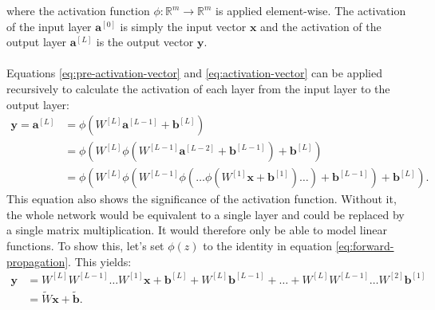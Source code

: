 where the activation function $\phi: \mathbb{R}^m \rightarrow \mathbb{R}^m$ is applied element-wise.
The activation of the input layer $\bm{a}^{[0]}$ is simply the input vector $\bm{x}$ and the activation of the output layer $\bm{a}^{[L]}$ is the output vector $\bm{y}$.
\\
\\
Equations \ref{eq:pre-activation-vector} and \ref{eq:activation-vector} can be applied recursively to calculate the activation of each layer from the input layer to the output layer:
\begin{align}
    \bm{y} = \bm{a}^{[L]} &= \phi(W^{[L]} \bm{a}^{[L-1]} + \bm{b}^{[L]}) \\
    &= \phi(W^{[L]} \phi(W^{[L-1]} \bm{a}^{[L-2]} + \bm{b}^{[L-1]}) + \bm{b}^{[L]}) \\
    &= \phi(W^{[L]} \phi(W^{[L-1]} \phi(\dots \phi(W^{[1]} \bm{x} + \bm{b}^{[1]}) \dots) + \bm{b}^{[L-1]}) + \bm{b}^{[L]}) \text{.}
    \label{eq:forward-propagation}
\end{align}
This equation also shows the significance of the activation function. 
Without it, the whole network would be equivalent to a single layer and could be replaced by a single matrix multiplication.
It would therefore only be able to model linear functions. 
To show this, let's set $\phi(z)$ to the identity in equation \ref{eq:forward-propagation}. This yields:
\begin{align}
    \bm{y} &= W^{[L]} W^{[L-1]} \dots W^{[1]} \bm{x} + \bm{b}^{[L]} + W^{[L]} \bm{b}^{[L-1]} + \dots + W^{[L]} W^{[L-1]} \dots W^{[2]} \bm{b}^{[1]} \\
    &= \widetilde{W} \bm{x} + \tilde{\bm{b}} \text{.}
    \label{eq:linear-network}
\end{align}

